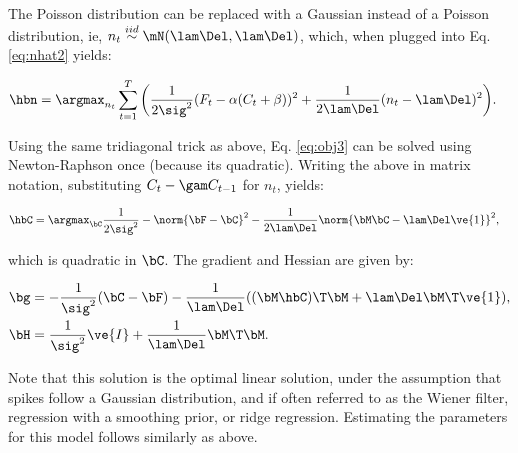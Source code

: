 The Poisson distribution can be replaced with a Gaussian instead of a Poisson distribution, ie,  $n_t \overset{iid}{\sim} \mN(\lam \Del, \lam \Del)$, which, when plugged into Eq. \eqref{eq:nhat2} yields:

\begin{align} \label{eq:obj3}
\hbn &= \argmax_{n_t}  \sum_{t=1}^T \bigg( \frac{1}{2 \sig^2}(F_t - \alpha(C_t + \beta))^2  + 
 \frac{1}{2 \lam \Del}(n_t - \lam \Del)^2\bigg).
\end{align}

Using the same tridiagonal trick as above, Eq. \eqref{eq:obj3} can be solved using Newton-Raphson once (because its quadratic).  Writing the above in matrix notation, substituting $C_t - \gam C_{t-1}$ for $n_t$, yields:

\begin{align}   \label{eq:w2}
\hbC&= \argmax_{\bC} \frac{1}{2\sig^2} -\norm{\bF - \bC}^2 - \frac{1}{2\lam\Del} \norm{\bM \bC - \lam\Del\ve{1}}^2,
\end{align}

\noindent which is quadratic in $\bC$.  The gradient and Hessian are given by:

\begin{align}
\bg &= -\frac{1}{\sig^2} (\bC - \bF) - \frac{1}{\lam\Del} ( (\bM \hbC)\T \bM + \lam\Del \bM\T \ve{1}), \\
\bH &= \frac{1}{\sig^2} \ve{I} + \frac{1}{\lam\Del} \bM\T \bM.
\end{align}

Note that this solution is the optimal linear solution, under the assumption that spikes follow a Gaussian distribution, and if often referred to as the Wiener filter, regression with a smoothing prior, or ridge regression.  Estimating the parameters for this model follows similarly as above. 